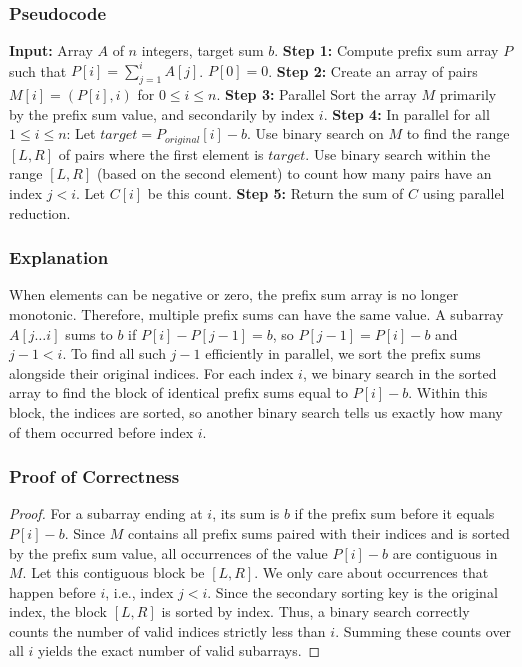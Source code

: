 \documentclass{article}
\begin{document}
\subsubsection{Pseudocode}
\begin{algorithm}
\caption{Count Subarrays with sum $b$ (General Array)}
\begin{algorithmic}[1]
\State \textbf{Input:} Array $A$ of $n$ integers, target sum $b$.
\State \textbf{Step 1:} Compute prefix sum array $P$ such that $P[i] = \sum_{j=1}^i A[j]$. $P[0] = 0$.
\State \textbf{Step 2:} Create an array of pairs $M[i] = (P[i], i)$ for $0 \le i \le n$.
\State \textbf{Step 3:} Parallel Sort the array $M$ primarily by the prefix sum value, and secondarily by index $i$.
\State \textbf{Step 4:} In parallel for all $1 \le i \le n$:
\State \quad Let $target = P_{original}[i] - b$.
\State \quad Use binary search on $M$ to find the range $[L, R]$ of pairs where the first element is $target$.
\State \quad Use binary search within the range $[L, R]$ (based on the second element) to count how many pairs have an index $j < i$.
\State \quad Let $C[i]$ be this count.
\State \textbf{Step 5:} Return the sum of $C$ using parallel reduction.
\end{algorithmic}
\end{algorithm}

\subsubsection{Explanation}
When elements can be negative or zero, the prefix sum array is no longer monotonic. Therefore, multiple prefix sums can have the same value. A subarray $A[j \dots i]$ sums to $b$ if $P[i] - P[j-1] = b$, so $P[j-1] = P[i] - b$ and $j-1 < i$.
To find all such $j-1$ efficiently in parallel, we sort the prefix sums alongside their original indices. For each index $i$, we binary search in the sorted array to find the block of identical prefix sums equal to $P[i] - b$. Within this block, the indices are sorted, so another binary search tells us exactly how many of them occurred before index $i$.

\subsubsection{Proof of Correctness}
\begin{proof}
For a subarray ending at $i$, its sum is $b$ if the prefix sum before it equals $P[i] - b$. Since $M$ contains all prefix sums paired with their indices and is sorted by the prefix sum value, all occurrences of the value $P[i] - b$ are contiguous in $M$. Let this contiguous block be $[L, R]$. We only care about occurrences that happen before $i$, i.e., index $j < i$. Since the secondary sorting key is the original index, the block $[L, R]$ is sorted by index. Thus, a binary search correctly counts the number of valid indices strictly less than $i$. Summing these counts over all $i$ yields the exact number of valid subarrays.
\end{proof}
\end{document}
